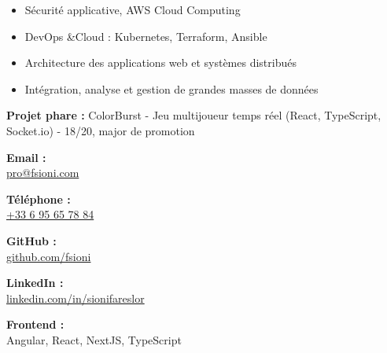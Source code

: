 \documentclass[a4paper,11pt]{article}
\begin{document}
\begin{cv}[profile][2]
\begin{cvevent}[2023][2025]
    \begin{itemize}
        \item Sécurité applicative, AWS Cloud Computing
        \item DevOps \&Cloud : Kubernetes, Terraform, Ansible
        \item Architecture des applications web et systèmes distribués
        \item Intégration, analyse et gestion de grandes masses de données
    \end{itemize}
\end{cvevent}

\begin{cvevent}[2019][2023]
    \textbf{Projet phare :} ColorBurst - Jeu multijoueur temps réel (React, TypeScript, Socket.io) - 18/20, major de promotion
\end{cvevent}

\cvsidebar

\begin{cvitem}[Envelope][4]
    \textbf{Email :}\\
    \href{mailto:pro@fsioni.com}{pro@fsioni.com}
\end{cvitem}

\cvseparator[3]
\begin{cvitem}[Phone][4]
    \textbf{ Téléphone :}\\
    \href{tel:+33695657884}
    {+33 6 95 65 78 84}
\end{cvitem}

\cvseparator[3]
\begin{cvitem}[Globe][4]
    \textbf{ GitHub :}\\
    \href{https://github.com/fsioni}{github.com/fsioni}
\end{cvitem}

\cvseparator[3]
\begin{cvitem}[Globe][4]
    \textbf{ LinkedIn :}\\
    \href{https://linkedin.com/in/sionifareslor}{linkedin.com/in/sionifareslor}
\end{cvitem}

\begin{cvitem}
    \textbf{ Frontend :} \\
    Angular, React, NextJS, TypeScript
\end{cvitem}


\end{cv}
\end{document}

